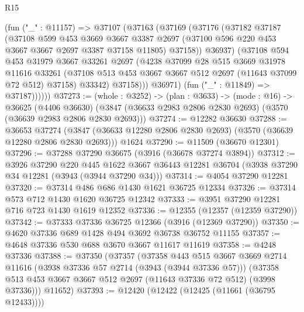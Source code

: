 \begin{lexlean}{R15}
\begin{coremodule}
              (fun ("_" : @11157) =>
              @37107
                (@37163
                  (@37169
                    (@37176
                      (@37182
                        @37187
                        (@37108
                          @599
                          @453
                          @3669
                          @3667
                          @3387
                          @2697
                          (@37100 @596 @220 @453 @3667 @3667 @2697 @3387 @37158 @11805)
                          @37158))
                      @36937)
                    (@37108
                      @594
                      @453
                      @31979
                      @3667
                      @33261
                      @2697
                      (@4238
                        @37099
                        @28
                        @515
                        @3669
                        @31978
                        @11616
                        @33261
                        (@37108 @513 @453 @3667 @3667 @512 @2697 (@11643 @37099 @72 @512) @37158)
                        @33342)
                      @37158)))
                @36971)
              (fun ("_" : @11849) => @37187))))))
@37273 := (whole : @3252) ->
  (plan : @3633) ->
  (mode : @16) ->
  @36625
    (@4406 @36630)
    (@3847 (@36633 @2983 @2806 @2830 @2693) (@3570 (@36639 @2983 @2806 @2830 @2693)))
@37274 := @12282 @36630
@37288 := @36653
    @37274
    (@3847 (@36633 @12280 @2806 @2830 @2693) (@3570 (@36639 @12280 @2806 @2830 @2693)))
    @1624
@37290 := @11509 (@36670 @12301)
@37296 := @37288 @37290 @36675 (@3916 (@36678 @37274 @3894))
@37312 := @3926
    @37290
    @220
    @445
    @1622
    @3667
    @36443
    @12281
    @36704
    (@3938 @37290 @34 @12281 (@3943 (@3944 @37290 @34)))
@37314 := @4054 @37290 @12281
@37320 := @37314 @486 @686 @1430 @1621 @36725 @12334
@37326 := @37314 @573 @712 @1430 @1620 @36725 @12342
@37333 := @3951 @37290 @12281 @716 @723 @1430 @1619 @12352
@37336 := @12355 (@12357 (@12359 @37290))
@37342 := @37333 @37336 @36725 @12366 (@3916 (@12369 @37290))
@37350 := @4620 @37336 @689 @1428 @494 @3692 @36738 @36752 @11155
@37357 := @4648 @37336 @530 @688 @3670 @3667 @11617 @11619
@37358 := @4248 @37336
@37388 := @37350
    (@37357
      (@37358
        @443
        @515
        @3667
        @3669
        @2714
        @11616
        (@3938 @37336 @57 @2714 (@3943 (@3944 @37336 @57)))
        (@37358 @513 @453 @3667 @3667 @512 @2697 (@11643 @37336 @72 @512) (@3998 @37336)))
      @11652)
@37393 := @12420 (@12422 (@12425 (@11661 (@36795 @12433))))

\end{coremodule}
\end{lexlean}
